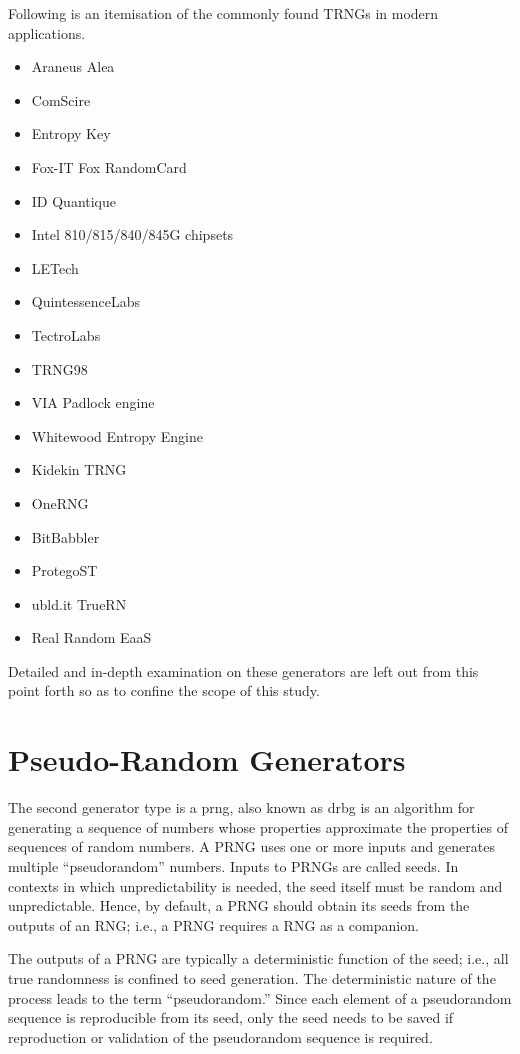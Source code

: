 Following is an itemisation of the commonly found TRNGs in modern applications.

\begin{itemize}
    \item Araneus Alea
    \item ComScire
    \item Entropy Key
    \item Fox-IT Fox RandomCard
    \item ID Quantique
    \item Intel 810/815/840/845G chipsets
    \item LETech
    \item QuintessenceLabs
    \item TectroLabs
    \item TRNG98
    \item VIA Padlock engine
    \item Whitewood Entropy Engine
    \item Kidekin TRNG
    \item OneRNG
    \item BitBabbler
    \item ProtegoST
    \item ubld.it TrueRN
    \item Real Random EaaS
\end{itemize}

Detailed and in-depth examination on these generators are left out from this point forth so as to confine the scope of this study.

\section{Pseudo-Random Generators}

The second generator type is a \acrfull{prng}, also known as \acrfull{drbg}\cite{rep_nist_sp_80057} is an algorithm for generating a sequence of numbers whose properties approximate the properties of sequences of random numbers. A PRNG uses one or more inputs and generates multiple “pseudorandom” numbers. Inputs to PRNGs are called seeds. In contexts in which unpredictability is needed, the seed itself must be random and unpredictable. Hence, by default, a PRNG should obtain its seeds from the outputs of an RNG; i.e., a PRNG requires a RNG as a companion.

The outputs of a PRNG are typically a deterministic function of the seed; i.e., all true randomness is confined to seed generation. The deterministic nature of the process leads to the term “pseudorandom.” Since each element of a pseudorandom sequence is reproducible from its seed, only the seed needs to be saved if reproduction or validation of the pseudorandom sequence is required.

